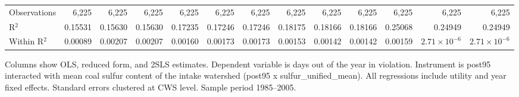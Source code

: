 \begin{table}[htbp]
\begin{adjustbox}{width = \textwidth, center}
\begin{tabular}{lrrrrrrrrrrrr}
          \\
         
         Observations                                                        & 6,225    & 6,225          & 6,225          & 6,225    & 6,225         & 6,225         & 6,225        & 6,225         & 6,225         & 6,225    & 6,225                 & 6,225\\  
         R$^2$                                                               & 0.15531  & 0.15630        & 0.15630        & 0.17235  & 0.17246       & 0.17246       & 0.18175      & 0.18166       & 0.18166       & 0.25068  & 0.24949               & 0.24949\\  
         Within R$^2$                                                        & 0.00089  & 0.00207        & 0.00207        & 0.00160  & 0.00173       & 0.00173       & 0.00153      & 0.00142       & 0.00142       & 0.00159  & $2.71\times 10^{-6}$  & $2.71\times 10^{-6}$\\   
         
         \bottomrule
         
      \end{tabular}
      
      
      
   \end{adjustbox}
      {\tiny\linespread{1}\selectfont \par \raggedright 
   Columns show OLS, reduced form, and 2SLS estimates. Dependent variable is days out of the year in violation. Instrument is post95 interacted with mean coal sulfur content of the intake watershed (post95 x sulfur\_unified\_mean). All regressions include utility and year fixed effects. Standard errors clustered at CWS level. Sample period 1985--2005.}
   
\end{table}


